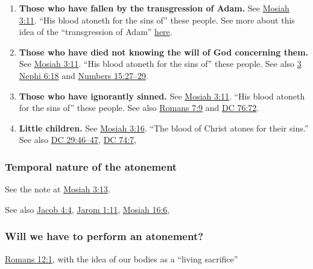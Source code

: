 			\begin{enumerate}
				\item \textbf{Those who have fallen by the transgression of Adam.} See \hyperref[MOSIAH-3-11]{Mosiah 3:11}. ``His blood atoneth for the sins of'' these people. See more about this idea of the ``transgression of Adam'' \hyperref[TRANSGRESSION-PHRASES]{here}.
				\item \textbf{Those who have died not knowing the will of God concerning them.} See \hyperref[MOSIAH-3-11]{Mosiah 3:11}. ``His blood atoneth for the sins of'' these people. See also \hyperref[3NEPHI-6-18]{3 Nephi 6:18} and \hyperref[NUMBERS-15-27]{Numbers 15:27--29}.
				\item \textbf{Those who have ignorantly sinned.} See \hyperref[MOSIAH-3-11]{Mosiah 3:11}. ``His blood atoneth for the sins of'' these people. See also \hyperref[ROMANS-7-9]{Romans 7:9} and \hyperref[DC76-72]{DC 76:72}.
				\item \textbf{Little children.} See \hyperref[MOSIAH-3-16]{Mosiah 3:16}. ``The blood of Christ atones for their sins.'' See also \hyperref[DC29-46]{DC 29:46--47}, \hyperref[DC74-7]{DC 74:7}, 
			\end{enumerate}
			
	\subsubsection{Temporal nature of the atonement}
	
		See the note at \hyperref[MOSIAH-3-13]{Mosiah 3:13}.
		
		\begin{compactitem}
			\item See also \hyperref[JACOB-4-4]{Jacob 4:4}, \hyperref[JAROM-1-11]{Jarom 1:11}, \hyperref[MOSIAH-16-6]{Mosiah 16:6},
		\end{compactitem}
		
	\subsubsection{Will we have to perform an atonement?}
	
		\begin{compactitem}
			\item \hyperref[ROMANS-12-1]{Romans 12:1}, with the idea of our bodies as a ``living sacrifice''
		\end{compactitem}